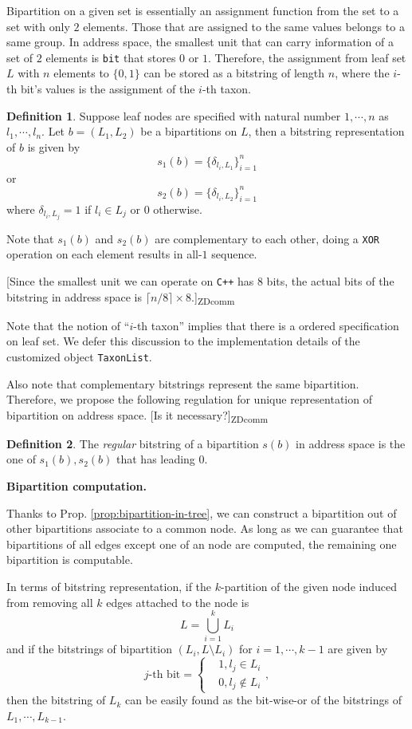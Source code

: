 \documentclass[11pt]{article}
\theoremstyle{definition}
\newtheorem{defn}{Definition}[section]
\theoremstyle{remark}
\theoremstyle{plain}
\newcommand{\zdcomm}[1]{ {\color{blue} [#1]\textsubscript{ZDcomm}}}
\begin{document}
Bipartition on a given set is essentially an assignment function from the set to a set with only $2$ elements. Those that are assigned to the same values belongs to a same group. In address space, the smallest unit that can carry information of a set of $2$ elements is \texttt{bit} that stores $0$ or $1$. Therefore, the assignment from leaf set $L$ with $n$ elements to $\{0,1\}$ can be stored as a bitstring of length $n$, where the $i$-th bit's values is the assignment of the $i$-th taxon. 
\begin{defn}
	Suppose leaf nodes are specified with natural number $1,\cdots, n$ as $l_1,\cdots, l_n$. Let $b = (L_1,L_2)$ be a bipartitions on $L$, then a bitstring representation of $b$ is given by
	\[
		s_1(b) = \{\delta_{l_i, L_1}\}_{i=1}^{n} 
	\]
	or 
	\[
		s_2(b) = \{\delta_{l_i, L_2}\}_{i=1}^{n} 
	\]
	where $\delta_{l_i, L_j} = 1$ if $l_i\in L_j$ or $0$ otherwise.
	
	Note that $s_1(b)$ and $s_2(b)$ are complementary to each other, doing a \texttt{XOR} operation on each element results in all-$1$ sequence.
\end{defn}

\zdcomm{Since the smallest unit we can operate on \texttt{C++} has $8$ bits, the actual bits of the bitstring in address space is $\lceil n/8\rceil \times 8$.}

Note that the notion of ``$i$-th taxon'' implies that there is a ordered specification on leaf set. We defer this discussion to the implementation details of the customized object \texttt{TaxonList}.

Also note that complementary bitstrings represent the same bipartition. Therefore, we propose the following regulation for unique representation of bipartition on address space. \zdcomm{Is it necessary?}

\begin{defn}
	The \emph{regular} bitstring of a bipartition $s(b)$ in address space is the one of $s_1(b), s_2(b)$ that has leading $0$.
\end{defn}

\noindent\textbf{Bipartition computation.}


Thanks to Prop. \ref{prop:bipartition-in-tree}, we can construct a bipartition out of other bipartitions associate to a common node. As long as we can guarantee that bipartitions of all edges except one of an node are computed, the remaining one bipartition is computable.

In terms of bitstring representation, if the $k$-partition of the given node induced from removing all $k$ edges attached to the node is
\[
	L = \bigcup_{i=1}^{k}L_i
\]
and if the bitstrings of bipartition $(L_i, L\setminus L_i)$ for $i = 1,\cdots, k-1$ are given by
\[
	j\text{-th bit} = \left\{ 
		\begin{aligned}
			&1, l_j\in L_i\\
			&0, l_j\notin L_i
		\end{aligned}
	\right.,
\]
then the bitstring of $L_k$ can be easily found as the bit-wise-or of the bitstrings of $L_1,\cdots, L_{k-1}$.
\end{document}
